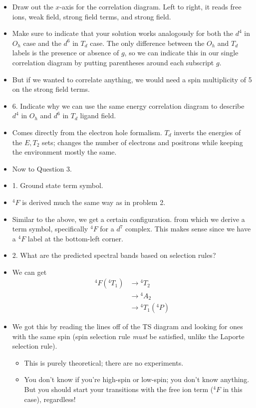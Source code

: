 \documentclass[../notes.tex]{subfiles}
\begin{document}
\begin{itemize}
    \item Draw out the $x$-axis for the correlation diagram. Left to right, it reads free ions, weak field, strong field terms, and strong field.
    \item Make sure to indicate that your solution works analogously for both the $d^4$ in $O_h$ case and the $d^6$ in $T_d$ case. The only difference between the $O_h$ and $T_d$ labels is the presence or absence of $g$, so we can indicate this in our single correlation diagram by putting parentheses around each subscript $g$.
    \item But if we wanted to correlate anything, we would need a spin multiplicity of 5 on the strong field terms.
    \item 6. Indicate why we can use the same energy correlation diagram to describe $d^4$ in $O_h$ and $d^6$ in $T_d$ ligand field.
    \item Comes directly from the electron hole formalism. $T_d$ inverts the energies of the $E,T_2$ sets; changes the number of electrons and positrons while keeping the environment mostly the same.
    \item Now to Question 3.
    \item 1. Ground state term symbol.
    \item ${}^4F$ is derived much the same way as in problem 2.
    \item Similar to the above, we get a certain configuration. from which we derive a term symbol, specifically ${}^4F$ for a $d^7$ complex. This makes sense since we have a ${}^4F$ label at the bottom-left corner.
    \item 2. What are the predicted spectral bands based on selection rules?
    \item We can get
    \begin{align*}
        {}^4F({}^4T_1) &\to {}^4T_2\\
        &\to {}^4A_2\\
        &\to {}^4T_1({}^4P)
    \end{align*}
    \item We got this by reading the lines off of the TS diagram and looking for ones with the same spin (spin selection rule \emph{must} be satisfied, unlike the Laporte selection rule).
    \begin{itemize}
        \item This is purely theoretical; there are no experiments.
        \item You don't know if you're high-spin or low-spin; you don't know anything. But you should start your transitions with the free ion term (${}^4F$ in this case), regardless!

\end{itemize}
\end{itemize}
\end{document}
